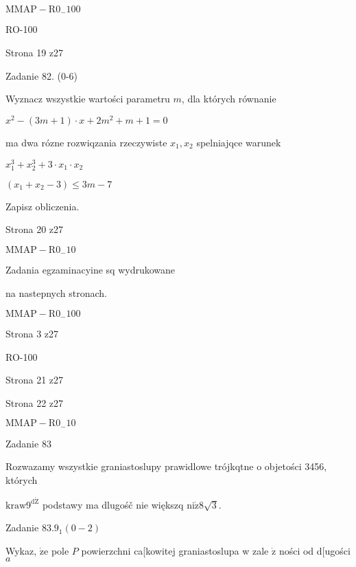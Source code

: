 \documentclass[a4paper,12pt]{article}
\begin{document}
$\mathrm{M}\mathrm{M}\mathrm{A}\mathrm{P}-\mathrm{R}0_{-}100$





RO-100

Strona 19 z27





Zadanie 82. (0-6)

Wyznacz wszystkie wartości parametru $m$, dla których równanie

$x^{2}-(3m+1)\cdot x+2m^{2}+m+1=0$

ma dwa rózne rozwiqzania rzeczywiste $x_{1}, x_{2}$ spelniajqce warunek

$x_{1}^{3}+x_{2}^{3}+3\cdot x_{1}\cdot x_{2}$

$(x_{1}+x_{2}-3)\leq 3m-7$

Zapisz obliczenia.

Strona 20 z27

$\mathrm{M}\mathrm{M}\mathrm{A}\mathrm{P}-\mathrm{R}0_{-}10$





Zadania egzaminacyine sq wydrukowane

na nastepnych stronach.

$\mathrm{M}\mathrm{M}\mathrm{A}\mathrm{P}-\mathrm{R}0_{-}100$

Strona 3 z27





RO-100

Strona 21 z27





Strona 22 z27

$\mathrm{M}\mathrm{M}\mathrm{A}\mathrm{P}-\mathrm{R}0_{-}10$





Zadanie 83

Rozwazamy wszystkie graniastoslupy prawidlowe trójkqtne o objetości 3456, których

$\mathrm{k}\mathrm{r}\mathrm{a}\mathrm{w}9^{\mathrm{d}\acute{\mathrm{Z}}}$ podstawy ma dlugośč nie większq $\mathrm{n}\mathrm{i}\dot{\mathrm{z}} 8\sqrt{3}.$

Zadanie $83.9_{1}(0-2)$

Wykaz, $\dot{\mathrm{z}}\mathrm{e}$ pole $P$ powierzchni ca[kowitej graniastoslupa w zale $\dot{\mathrm{z}}$ ności od d[ugości $a$
\end{document}
